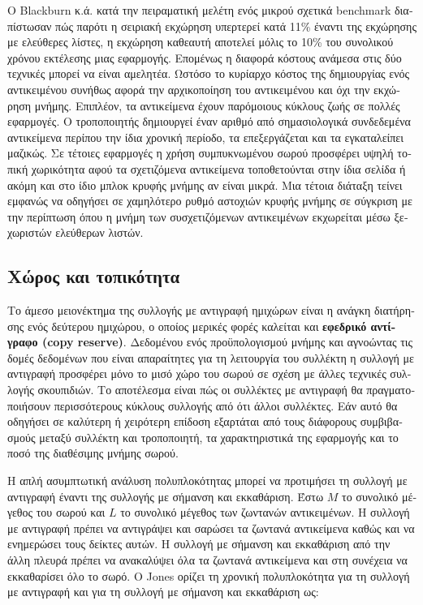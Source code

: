 \begin{greek}
Ο Blackburn κ.ά. \cite{DBLP:conf/icse/BlackburnCM04} κατά την πειραματική μελέτη ενός
μικρού σχετικά benchmark διαπίστωσαν πώς παρότι η σειριακή
εκχώρηση υπερτερεί κατά 11\% έναντι της εκχώρησης με ελεύθερες
λίστες, η εκχώρηση καθεαυτή αποτελεί μόλις το 10\% του
συνολικού χρόνου εκτέλεσης μιας εφαρμογής. Επομένως η διαφορά
κόστους ανάμεσα στις δύο τεχνικές μπορεί να είναι αμελητέα.
Ωστόσο το κυρίαρχο κόστος της δημιουργίας ενός αντικειμένου 
συνήθως αφορά την αρχικοποίηση του αντικειμένου και όχι την
εκχώρηση μνήμης. Επιπλέον, τα αντικείμενα έχουν παρόμοιους
κύκλους ζωής σε πολλές εφαρμογές. Ο τροποποιητής δημιουργεί
έναν αριθμό από σημασιολογικά συνδεδεμένα αντικείμενα περίπου
την ίδια χρονική περίοδο, τα επεξεργάζεται και τα εγκαταλείπει
μαζικώς. Σε τέτοιες εφαρμογές η χρήση συμπυκνωμένου σωρού
προσφέρει υψηλή τοπική χωρικότητα αφού τα σχετιζόμενα αντικείμενα
τοποθετούνται στην ίδια σελίδα ή ακόμη και στο ίδιο μπλοκ
κρυφής μνήμης αν είναι μικρά. Μια τέτοια διάταξη τείνει
εμφανώς να οδηγήσει σε χαμηλότερο ρυθμό αστοχιών κρυφής
μνήμης σε σύγκριση με την περίπτωση όπου η μνήμη των συσχετιζόμενων
αντικειμένων εκχωρείται μέσω ξεχωριστών ελεύθερων λιστών.

\subsection{Χώρος και τοπικότητα}
Το άμεσο μειονέκτημα της συλλογής με αντιγραφή ημιχώρων είναι
η ανάγκη διατήρησης ενός δεύτερου ημιχώρου, ο οποίος μερικές
φορές καλείται και \textbf{εφεδρικό αντίγραφο (copy reserve)}.
Δεδομένου ενός προϋπολογισμού μνήμης και αγνοώντας τις δομές
δεδομένων που είναι απαραίτητες για τη λειτουργία του συλλέκτη
η συλλογή με αντιγραφή προσφέρει μόνο το μισό χώρο του σωρού
σε σχέση με άλλες τεχνικές συλλογής σκουπιδιών. Το αποτέλεσμα
είναι πώς οι συλλέκτες με αντιγραφή θα πραγματοποιήσουν περισσότερους
κύκλους συλλογής από ότι άλλοι συλλέκτες. Εάν αυτό θα οδηγήσει
σε καλύτερη ή χειρότερη επίδοση εξαρτάται από τους διάφορους
συμβιβασμούς μεταξύ συλλέκτη και τροποποιητή, τα χαρακτηριστικά
της εφαρμογής και το ποσό της διαθέσιμης μνήμης σωρού.

Η απλή ασυμπτωτική ανάλυση πολυπλοκότητας μπορεί να προτιμήσει
τη συλλογή με αντιγραφή έναντι της συλλογής με σήμανση και
εκκαθάριση. Έστω $M$ το συνολικό μέγεθος του σωρού και $L$ το
συνολικό μέγεθος των ζωντανών αντικειμένων. Η συλλογή με αντιγραφή
πρέπει να αντιγράψει και σαρώσει τα ζωντανά αντικείμενα καθώς
και να ενημερώσει τους δείκτες αυτών. Η συλλογή με σήμανση και
εκκαθάριση από την άλλη πλευρά πρέπει να ανακαλύψει όλα τα ζωντανά
αντικείμενα και στη συνέχεια να εκκαθαρίσει όλο το σωρό.
Ο Jones \cite{DBLP:books/wi/JonesL96} ορίζει τη χρονική πολυπλοκότητα για τη συλλογή
με αντιγραφή και για τη συλλογή με σήμανση και εκκαθάριση ως:


\end{greek}
